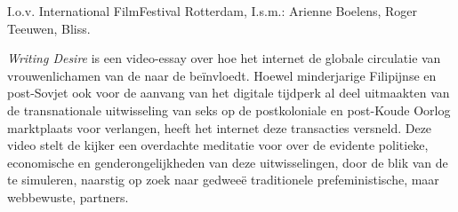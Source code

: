 {{I.o.v. International FilmFestival Rotterdam, I.s.m.: Arienne Boelens,
Roger Teeuwen, Bliss.


{\em Writing Desire} is een video{}-essay over hoe het internet de
globale circulatie van vrouwenlichamen van de  naar de  be\"invloedt. Hoewel minderjarige Filipijnse 
en post{}-Sovjet  ook voor de aanvang van het
digitale tijdperk al deel uitmaakten van de transnationale uitwisseling
van seks op de postkoloniale en post{}-Koude Oorlog marktplaats voor
verlangen, heeft het internet deze transacties versneld. Deze video
stelt de kijker een overdachte meditatie voor over de evidente
politieke, economische en genderongelijkheden van deze uitwisselingen,
door de blik van de  te simuleren, naarstig op zoek
naar gedwee\"e traditionele prefeministische, maar webbewuste,
partners. 
\blank
{}
}
}
